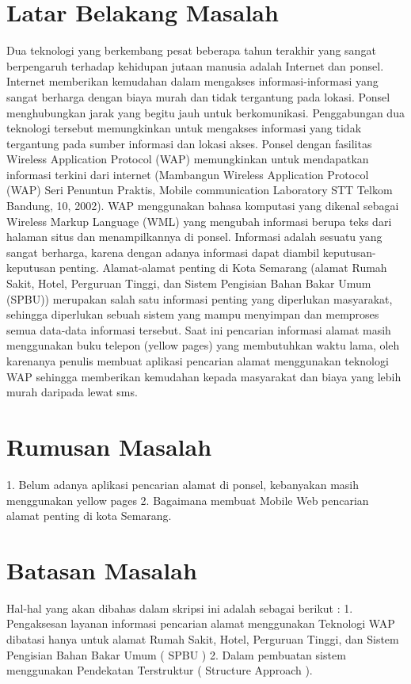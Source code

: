 \documentclass{jtetiproposalskripsi}
\begin{document}
\section{Latar Belakang Masalah}
Dua teknologi yang berkembang pesat beberapa tahun terakhir yang sangat berpengaruh terhadap kehidupan jutaan manusia adalah Internet dan ponsel. Internet memberikan kemudahan dalam mengakses informasi-informasi yang sangat berharga dengan biaya murah dan tidak tergantung pada lokasi. Ponsel menghubungkan jarak yang begitu jauh untuk berkomunikasi. Penggabungan dua teknologi tersebut memungkinkan untuk mengakses informasi yang tidak tergantung pada sumber
informasi dan lokasi akses.
Ponsel dengan fasilitas Wireless Application Protocol (WAP) memungkinkan untuk mendapatkan informasi terkini dari internet (Mambangun Wireless Application Protocol (WAP) Seri Penuntun Praktis, Mobile communication Laboratory STT Telkom Bandung, 10, 2002). WAP menggunakan bahasa komputasi yang dikenal sebagai Wireless Markup Language (WML) yang mengubah informasi berupa teks dari halaman situs dan menampilkannya di ponsel. Informasi adalah sesuatu yang sangat berharga, karena dengan adanya informasi dapat diambil keputusan-keputusan penting. Alamat-alamat penting di Kota Semarang (alamat Rumah Sakit, Hotel, Perguruan Tinggi, dan Sistem Pengisian Bahan Bakar Umum (SPBU)) merupakan salah satu informasi penting yang diperlukan masyarakat, sehingga diperlukan sebuah sistem yang mampu menyimpan dan memproses semua data-data informasi tersebut. Saat ini pencarian informasi alamat masih menggunakan buku telepon (yellow pages) yang membutuhkan waktu lama, oleh karenanya penulis membuat aplikasi pencarian alamat menggunakan teknologi WAP sehingga memberikan kemudahan kepada masyarakat dan biaya yang lebih murah daripada lewat sms.

\section{Rumusan Masalah}
1. Belum adanya aplikasi pencarian alamat di ponsel, kebanyakan masih menggunakan yellow pages 
2. Bagaimana membuat Mobile Web pencarian alamat penting di kota Semarang.

\section{Batasan Masalah}
Hal-hal yang akan dibahas dalam skripsi ini adalah sebagai berikut : 
1. Pengaksesan layanan informasi pencarian alamat menggunakan Teknologi WAP dibatasi hanya untuk alamat Rumah Sakit, Hotel, Perguruan Tinggi, dan Sistem Pengisian Bahan Bakar Umum ( SPBU ) 
2. Dalam pembuatan sistem menggunakan Pendekatan Terstruktur ( Structure Approach ). 
\end{document}
